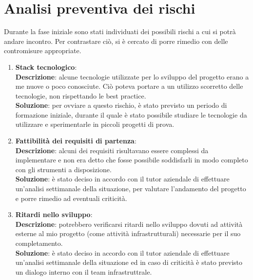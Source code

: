 \section{Analisi preventiva dei rischi}
Durante la fase iniziale sono stati individuati dei possibili rischi a cui si potrà andare incontro. Per contrastare ciò, si è cercato di porre rimedio con delle contromisure appropriate.
\begin{enumerate}
    \item \textbf{Stack tecnologico}:\\
        \textbf{Descrizione}: alcune tecnologie utilizzate per lo sviluppo del progetto erano a me nuove o poco conosciute. Ciò poteva portare a un utilizzo scorretto delle tecnologie, non rispettando le best practice.\\
        \textbf{Soluzione}: per ovviare a questo rischio, è stato previsto un periodo di formazione iniziale, durante il quale è stato possibile studiare le tecnologie da utilizzare e sperimentarle in piccoli progetti di prova.\\
    \item \textbf{Fattibilità dei requisiti di partenza}:\\
        \textbf{Descrizione}: alcuni dei requisiti risultavano essere complessi da implementare e non era detto che fosse possibile soddisfarli in modo completo con gli strumenti a disposizione.\\
        \textbf{Soluzione}: è stato deciso in accordo con il tutor aziendale di effettuare un'analisi settimanale della situazione, per valutare l'andamento del progetto e porre rimedio ad eventuali criticità.\\
    \item \textbf{Ritardi nello sviluppo}:\\
        \textbf{Descrizione}: potrebbero verificarsi ritardi nello sviluppo dovuti ad attività esterne al mio progetto (come attività infrastrutturali) necessarie per il suo completamento.\\
        \textbf{Soluzione}: è stato deciso in accordo con il tutor aziendale di effettuare un'analisi settimanale della situazione ed in caso di criticità è stato previsto un dialogo interno con il team infrastruttrale.\\
\end{enumerate}








